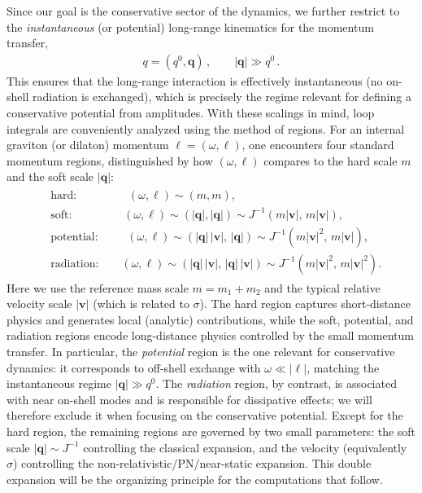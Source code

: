 {Since our goal is the conservative sector of the dynamics, we further restrict to the \emph{instantaneous} (or potential) long-range kinematics for the momentum transfer,
\begin{align}
q=(q^0,\boldsymbol{q})\,,\qquad |\boldsymbol{q}| \gg q^0\, .
\end{align}
This ensures that the long-range interaction is effectively instantaneous (no on-shell radiation is exchanged), which is precisely the regime relevant for defining a conservative potential from amplitudes. With these scalings in mind, loop integrals are conveniently analyzed using the method of regions.
For an internal graviton (or dilaton) momentum $\ell=(\omega,\boldsymbol{\ell})$, one encounters four standard momentum regions, distinguished by how $(\omega,\boldsymbol{\ell})$ compares to the hard scale $m$ and the soft scale $|\boldsymbol{q}|$:
\begin{align}
\begin{split}
    &\text{hard:}\qquad\qquad\;\; (\omega,\boldsymbol{\ell}) \sim (m,m),\\
    &\text{soft:}\qquad\qquad\;\; (\omega,\boldsymbol{\ell}) \sim (|\boldsymbol{q}|,|\boldsymbol{q}|) 
    \sim J^{-1}(m|\boldsymbol{v}|,\,m|\boldsymbol{v}|),\\
    &\text{potential:}\qquad\;\; (\omega,\boldsymbol{\ell}) \sim (|\boldsymbol{q}|\,|\boldsymbol{v}|,\,|\boldsymbol{q}|)
    \sim J^{-1}(m|\boldsymbol{v}|^2,\,m|\boldsymbol{v}|),\\
    &\text{radiation:}\qquad (\omega,\boldsymbol{\ell}) \sim (|\boldsymbol{q}|\,|\boldsymbol{v}|,\,|\boldsymbol{q}|\,|\boldsymbol{v}|)
    \sim J^{-1}(m|\boldsymbol{v}|^2,\,m|\boldsymbol{v}|^2).
\end{split}
\end{align}
Here we use the reference mass scale $m=m_1+m_2$ and the typical relative velocity scale $|\boldsymbol{v}|$ (which is related to $\sigma$).
The hard region captures short-distance physics and generates local (analytic) contributions, while the soft, potential, and radiation regions encode long-distance physics controlled by the small momentum transfer.
In particular, the \emph{potential} region is the one relevant for conservative dynamics: it corresponds to off-shell exchange with $\omega \ll |\boldsymbol{\ell}|$, matching the instantaneous regime $|\boldsymbol{q}|\gg q^0$.
The \emph{radiation} region, by contrast, is associated with near on-shell modes and is responsible for dissipative effects; we will therefore exclude it when focusing on the conservative potential. Except for the hard region, the remaining regions are governed by two small parameters: the soft scale $|\boldsymbol{q}|\sim J^{-1}$ controlling the classical expansion, and the velocity (equivalently $\sigma$) controlling the non-relativistic/PN/near-static expansion.
This double expansion will be the organizing principle for the computations that follow.}
